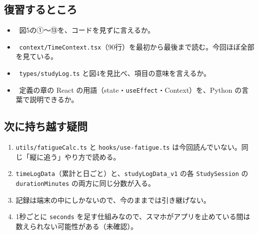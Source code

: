 \subsection{復習するところ}
\begin{itemize}
  \item \tagA\ 図5の①〜⑬を、コードを見ずに言えるか。
  \item \tagA\ \texttt{context/TimeContext.tsx}（90行）を最初から最後まで読む。今回ほぼ全部を見ている。
  \item \tagB\ \texttt{types/studyLog.ts} と図4を見比べ、項目の意味を言えるか。
  \item \tagB\ 定義の章の React の用語（state・\texttt{useEffect}・Context）を、Python の言葉で説明できるか。
\end{itemize}

\subsection{次に持ち越す疑問}
\begin{enumerate}
  \item {}\texttt{utils/fatigueCalc.ts} と \texttt{hooks/use-fatigue.ts} は今回読んでいない。同じ「縦に追う」やり方で読める。
  \item {}\texttt{timeLogData}（累計と日ごと）と、\texttt{studyLogData\_v1} の各 \texttt{StudySession} の \texttt{durationMinutes} の両方に同じ分数が入る。
  \item {}記録は端末の中にしかないので、今のままでは引き継げない。
  \item {}1秒ごとに \texttt{seconds} を足す仕組みなので、スマホがアプリを止めている間は数えられない可能性がある（未確認）。
\end{enumerate}

